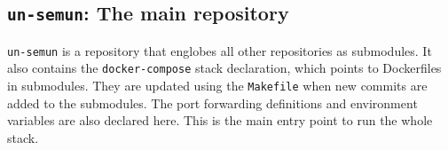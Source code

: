 
\subsection{\texttt{un-semun}: The main repository} \label{ssec:un-semun-the-main-repository}

\texttt{un-semun} is a repository that englobes all other repositories as submodules. It also contains the \texttt{docker-compose} stack declaration, which points to Dockerfiles in submodules. They are updated using the \texttt{Makefile} when new commits are added to the submodules. The port forwarding definitions and environment variables are also declared here. This is the main entry point to run the whole stack.
